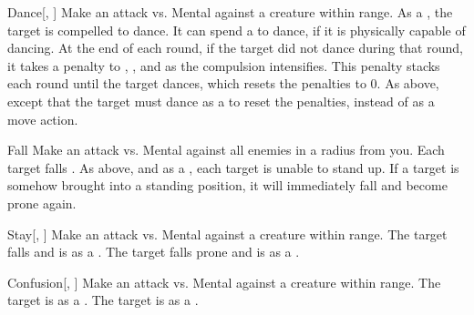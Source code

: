 \lowercase{\hypertarget{spell:Dance}{}}\label{spell:Dance}
\begin{ability}[\nth{1}]{\hypertarget{spell:Dance}{Dance}}[, ]
Make an attack vs. Mental against a creature within \rngmed range.
\hit As a , the target is compelled to dance.
It can spend a  to dance, if it is physically capable of dancing.
At the end of each round, if the target did not dance during that round, it takes a  penalty to , , and  as the compulsion intensifies.
This penalty stacks each round until the target dances, which resets the penalties to 0.
\crit As above, except that the target must dance as a  to reset the penalties, instead of as a move action.
\end{ability}
\vspace{0.25em}



\lowercase{\hypertarget{spell:Fall}{}}\label{spell:Fall}
\begin{ability}[\nth{1}]{\hypertarget{spell:Fall}{Fall}}
Make an attack vs. Mental against all enemies in a \areamed radius from you.
\hit Each target falls .
\crit As above, and as a , each target is unable to stand up.
If a target is somehow brought into a standing position, it will immediately fall and become prone again.
\end{ability}
\vspace{0.25em}



\lowercase{\hypertarget{spell:Stay}{}}\label{spell:Stay}
\begin{ability}[\nth{2}]{\hypertarget{spell:Stay}{Stay}}[, ]
Make an attack vs. Mental against a creature within \rngmed range.
\hit The target falls  and is  as a .
\crit The target falls prone and is  as a .
\end{ability}
\vspace{0.25em}



\lowercase{\hypertarget{spell:Confusion}{}}\label{spell:Confusion}
\begin{ability}[\nth{3}]{\hypertarget{spell:Confusion}{Confusion}}[, ]
Make an attack vs. Mental against a creature within \rngmed range.
\hit The target is \disoriented as a .
\crit The target is \confused as a .
\end{ability}
\vspace{0.25em}



